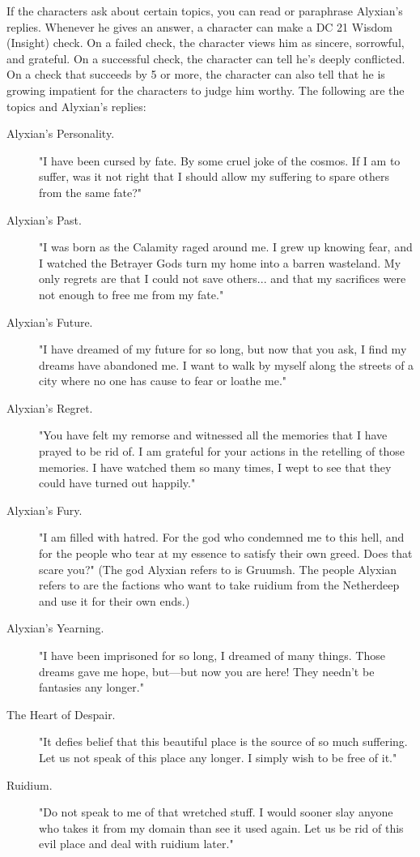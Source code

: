 \documentclass[letterpaper, 11pt, bg=full, twocolumn]{dndbook}
\begin{document}
If the characters ask about certain topics, you can read or paraphrase Alyxian's replies. Whenever he gives an answer, a character can make a DC 21 Wisdom (Insight) check. On a failed check, the character views him as sincere, sorrowful, and grateful. On a successful check, the character can tell he's deeply conflicted. On a check that succeeds by 5 or more, the character can also tell that he is growing impatient for the characters to judge him worthy. The following are the topics and Alyxian's replies:

\begin{description}
\item[Alyxian's Personality.] "I have been cursed by fate. By some cruel joke of the cosmos. If I am to suffer, was it not right that I should allow my suffering to spare others from the same fate?"
\item[Alyxian's Past.] "I was born as the Calamity raged around me. I grew up knowing fear, and I watched the Betrayer Gods turn my home into a barren wasteland. My only regrets are that I could not save others... and that my sacrifices were not enough to free me from my fate."
\item[Alyxian's Future.] "I have dreamed of my future for so long, but now that you ask, I find my dreams have abandoned me. I want to walk by myself along the streets of a city where no one has cause to fear or loathe me."
\item[Alyxian's Regret.] "You have felt my remorse and witnessed all the memories that I have prayed to be rid of. I am grateful for your actions in the retelling of those memories. I have watched them so many times, I wept to see that they could have turned out happily."
\item[Alyxian's Fury.] "I am filled with hatred. For the god who condemned me to this hell, and for the people who tear at my essence to satisfy their own greed. Does that scare you?" (The god Alyxian refers to is Gruumsh. The people Alyxian refers to are the factions who want to take ruidium from the Netherdeep and use it for their own ends.)
\item[Alyxian's Yearning.] "I have been imprisoned for so long, I dreamed of many things. Those dreams gave me hope, but---but now you are here! They needn't be fantasies any longer."
\item[The Heart of Despair.] "It defies belief that this beautiful place is the source of so much suffering. Let us not speak of this place any longer. I simply wish to be free of it."
\item[Ruidium.] "Do not speak to me of that wretched stuff. I would sooner slay anyone who takes it from my domain than see it used again. Let us be rid of this evil place and deal with ruidium later."
\end{description}
\end{document}
